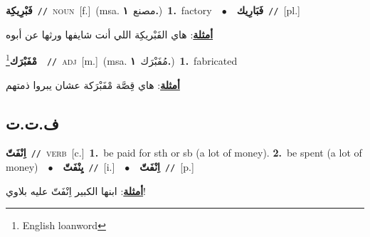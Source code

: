 \documentclass[10pt,a4paper,twoside]{article} %
\begin{document}
\begin{multicols}{2}
{{\setlength\topsep{0pt}\textbf{\foreignlanguage{arabic}{فَبْرِيكِة}}\ {\color{gray}\texttt{//}\color{black}}\ \textsc{noun}\ [f.]\ \color{gray}(msa. \foreignlanguage{arabic}{مصنع}~\foreignlanguage{arabic}{\textbf{١.}})\color{black}\ \textbf{1.}~factory\ \ $\bullet$\ \ \setlength\topsep{0pt}\textbf{\foreignlanguage{arabic}{فَبَارِيك}}\ {\color{gray}\texttt{//}\color{black}}\ [pl.]\  \begin{flushright}\color{gray}\foreignlanguage{arabic}{\textbf{\underline{\foreignlanguage{arabic}{أمثلة}}}: هاي الفَبْريكِة اللي أنت شايفها ورثها عن أبوه}\end{flushright}\color{black}} \vspace{2mm}

{\setlength\topsep{0pt}\textbf{\foreignlanguage{arabic}{مْفَبْرَك}}\footnote{English loanword}\ \ {\color{gray}\texttt{//}\color{black}}\ \textsc{adj}\ [m.]\ \color{gray}(msa. \foreignlanguage{arabic}{مُفَبْرَك}~\foreignlanguage{arabic}{\textbf{١.}})\color{black}\ \textbf{1.}~fabricated\  \begin{flushright}\color{gray}\foreignlanguage{arabic}{\textbf{\underline{\foreignlanguage{arabic}{أمثلة}}}: هاي قِصَّة مْفَبْرَكة عشان يبروا ذمتهم}\end{flushright}\color{black}} \vspace{2mm}

\vspace{-3mm}
\subsection*{\color{blue}\foreignlanguage{arabic}{ف.ت.ت}\color{blue}{}} 

{\setlength\topsep{0pt}\textbf{\foreignlanguage{arabic}{اِنْفَتّ}}\ {\color{gray}\texttt{//}\color{black}}\ \textsc{verb}\ [c.]\ \textbf{1.}~be paid for sth or sb (a lot of money).  \textbf{2.}~be spent (a lot of money)\ \ $\bullet$\ \ \setlength\topsep{0pt}\textbf{\foreignlanguage{arabic}{يِنْفَتّ}}\ {\color{gray}\texttt{//}\color{black}}\ [i.]\ \ $\bullet$\ \ \setlength\topsep{0pt}\textbf{\foreignlanguage{arabic}{اِنْفَتّ}}\ {\color{gray}\texttt{//}\color{black}}\ [p.]\  \begin{flushright}\color{gray}\foreignlanguage{arabic}{\textbf{\underline{\foreignlanguage{arabic}{أمثلة}}}: ابنها الكبير اِنْفَتّ عليه بلاوي!}\end{flushright}\color{black}} \vspace{2mm}

}
\end{multicols}
\end{document}
